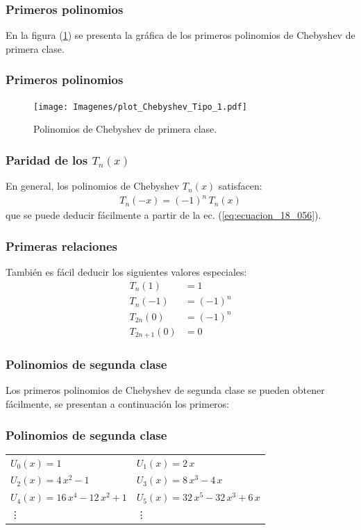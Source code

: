 \documentclass[12pt]{beamer}
\begin{document}
\begin{frame}
\frametitle{Primeros polinomios}
En la figura (\ref{fig:figura_plot_chebychev_01}) se presenta la gráfica de los primeros polinomios de Chebyshev de primera clase.
\end{frame}
\begin{frame}
\frametitle{Primeros polinomios}
\begin{figure}[H]
    \centering
    \texttt{[image: Imagenes/plot\_Chebyshev\_Tipo\_1.pdf]}
    \caption{Polinomios de Chebyshev de primera clase.}
    \label{fig:figura_plot_chebychev_01}
\end{figure}
\end{frame}
\begin{frame}
\frametitle{Paridad de los $T_{n} (x)$}
En general, los polinomios de Chebyshev $T_{n} (x)$ satisfacen:
\pause
\begin{align*}
T_{n} (-x) = (-1)^{n} \, T_{n} (x)
\end{align*}
que se puede deducir fácilmente a partir de la ec. (\ref{eq:ecuacion_18_056}).
\end{frame}
\begin{frame}
    \frametitle{Primeras relaciones}
También es fácil deducir los siguientes valores especiales:
\pause
\begin{align*}
T_{n} (1) &= 1 \\[0.5em]
T_{n} (-1) &= (-1)^{n} \\[0.5em]
T_{2n} (0) &= (-1)^{n} \\[0.5em]
T_{2n+1} (0) &= 0
\end{align*}
\end{frame}
\begin{frame}
\frametitle{Polinomios de segunda clase}
Los primeros polinomios de Chebyshev de segunda clase se pueden obtener fácilmente, se presentan a continuación los primeros:
\end{frame}
\begin{frame}
\frametitle{Polinomios de segunda clase}
\begin{table}[H]
\centering
\fontsize{14}{14}\selectfont
\begin{tabular}{p{4.8cm} p{5cm}}
$U_{0} (x) {=} 1$ & $U_{1} (x) {=} 2 \, x$ \\[0.5em]
$U_{2} (x) {=} 4 \, x^{2} {-} 1$ & $U_{3} (x) {=} 8 \, x^{3} {-} 4 \, x$ \\[0.5em]
$U_{4} (x) {=} 16 \, x^{4} {-} 12 \, x^{2} {+} 1$ & $U_{5} (x) {=} 32 \, x^{5} {-} 32 \, x^{3} {+} 6 \, x$ \\
\vdots & \vdots
\end{tabular}
\end{table}
\end{frame}
\end{document}
